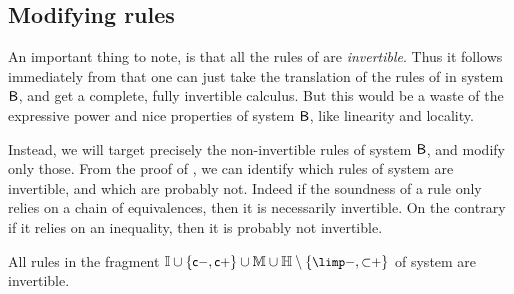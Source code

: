 \subsection{Modifying rules}

An important thing to note, is that all the rules of  are
\emph{invertible}. Thus it follows immediately from
 that one can just take the translation of the rules
of  in system $\sysB$, and get a complete, fully invertible
calculus. But this would be a waste of the expressive power and nice properties
of system $\sysB$, like linearity and locality.

Instead, we will target precisely the non-invertible rules of system $\sysB$,
and modify only those. From the proof of , we
can identify which rules of system  are invertible, and which are
probably not. Indeed if the soundness of a rule only relies on a chain of
equivalences, then it is necessarily invertible. On the contrary if it relies on
an inequality, then it is probably not invertible.

\begin{fact}
  All rules in the fragment $\mathbb{I} \cup \{\rsf{c{-}},\rsf{c{+}}\} \cup
    \mathbb{M} \cup \mathbb{H} \setminus \{\rsf{{\limp}{-}},\rsf{{\lsub}{+}}\}$ of
  system  are invertible.
\end{fact}

